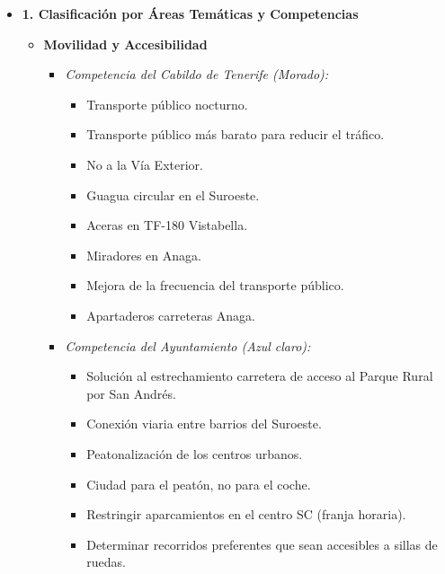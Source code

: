 

\begin{itemize}
    \item \textbf{1. Clasificación por Áreas Temáticas y Competencias}
    \begin{itemize}
        \item \textbf{Movilidad y Accesibilidad}
        \begin{itemize}
            \item \textit{Competencia del Cabildo de Tenerife (Morado):}
            \begin{itemize}
                \item Transporte público nocturno.
                \item Transporte público más barato para reducir el tráfico.
                \item No a la Vía Exterior.
                \item Guagua circular en el Suroeste.
                \item Aceras en TF-180 Vistabella.
                \item Miradores en Anaga.
                \item Mejora de la frecuencia del transporte público.
                \item Apartaderos carreteras Anaga.
            \end{itemize}
            \item \textit{Competencia del Ayuntamiento (Azul claro):}
            \begin{itemize}
                \item Solución al estrechamiento carretera de acceso al Parque Rural por San Andrés.
                \item Conexión viaria entre barrios del Suroeste.
                \item Peatonalización de los centros urbanos.
                \item Ciudad para el peatón, no para el coche.
                \item Restringir aparcamientos en el centro SC (franja horaria).
                \item Determinar recorridos preferentes que sean accesibles a sillas de ruedas.
            \end{itemize}
        \end{itemize}


\end{itemize}
\end{itemize}
